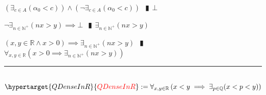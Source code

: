 \documentclass{book}
\newcommand{\df}[1]{\hypertarget{#1}{\textcolor{red}{#1}}}
\newcommand{\abr}{:=}
\newcommand{\pipe}{$\phantom{(}\vrectangleblack\phantom{)}$}
\newcommand{\pr}[1]{\left(#1\right)}
\begin{document}
\begin{enumerate}
\begin{enumerate}
\begin{enumerate}
      \lit $\pr{\exists_{c \in A}(\alpha_0 < c)} \land \pr{\lnot \exists_{c \in A}(\alpha_0 < c)}$ \pipe $\bot$
    \end{enumerate}
    \lit $\lnot \exists_{n \in \mathbb{N}^+}(n x > y) \implies \bot$ \pipe $\exists_{n \in \mathbb{N}^+}(n x > y)$
  \end{enumerate}
  \lit $(x, y \in \mathbb{R} \land x > 0) \implies \exists_{n \in \mathbb{N}^+}(n x > y)$ \pipe $\forall_{x, y \in \mathbb{R}}\pr{x > 0 \implies \exists_{n \in \mathbb{N}^+}(n x > y)}$
\end{enumerate} \vspace{.75mm} \hrule \vspace{.75mm} \ \\ 

$\df{QDenseInR} \abr \forall_{x, y \in \mathbb{R}}\pr{x < y \implies \exists_{p \in \mathbb{Q}}(x < p < y)}$
\end{document}

